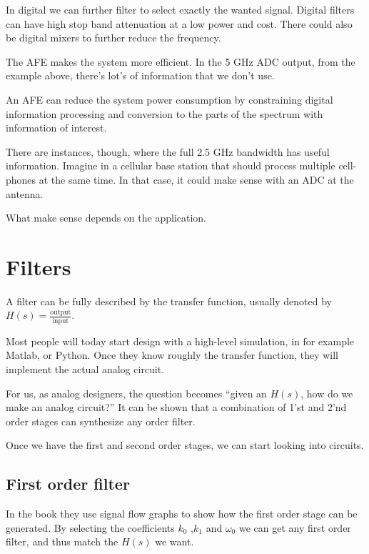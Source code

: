 In digital we can further filter to select exactly the wanted signal.
Digital filters can have high stop band attenuation at a low power and
cost. There could also be digital mixers to further reduce the
frequency.

The AFE makes the system more efficient. In the 5 GHz ADC output, from
the example above, there's lot's of information that we don't use.

An AFE can reduce the system power consumption by constraining digital
information processing and conversion to the parts of the spectrum with
information of interest.

There are instances, though, where the full 2.5 GHz bandwidth has useful
information. Imagine in a cellular base station that should process
multiple cell-phones at the same time. In that case, it could make sense
with an ADC at the antenna.

What make sense depends on the application.

\section{Filters}\label{filters}

A filter can be fully described by the transfer function, usually
denoted by \(H(s) = \frac{\text{output}}{\text{input}}\).

Most people will today start design with a high-level simulation, in for
example Matlab, or Python. Once they know roughly the transfer function,
they will implement the actual analog circuit.

For us, as analog designers, the question becomes ``given an \(H(s)\),
how do we make an analog circuit?'' It can be shown that a combination
of 1'st and 2'nd order stages can synthesize any order filter.

Once we have the first and second order stages, we can start looking
into circuits.

\subsection{First order filter}\label{first-order-filter}

In the book they use signal flow graphs to show how the first order
stage can be generated. By selecting the coefficients \(k_0\) ,\(k_1\)
and \(\omega_0\) we can get any first order filter, and thus match the
\(H(s)\) we want.

